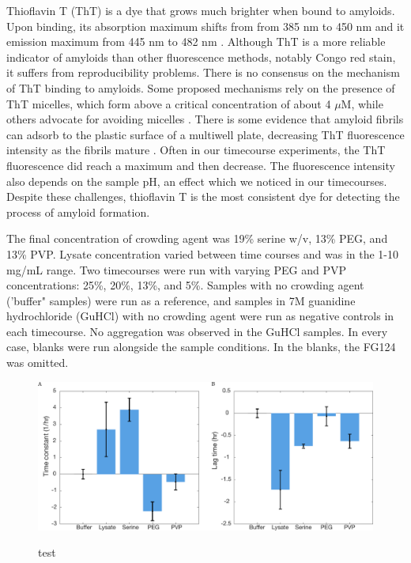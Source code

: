 Thioflavin T (ThT) is a dye that grows much brighter when bound to amyloids.  Upon binding, its absorption maximum shifts from from 385 nm to 450 nm and it emission maximum from 445 nm to 482 nm \cite{picken12}.  Although ThT is a more reliable indicator of amyloids than other fluorescence methods, notably Congo red stain, it suffers from reproducibility problems.  There is no consensus on the mechanism of ThT binding to amyloids.  Some proposed mechanisms rely on the presence of ThT micelles, which form above a critical concentration of about 4 $\mu$M, while others advocate for avoiding micelles \cite{khurana05, groenning09}.  There is some evidence that amyloid fibrils can adsorb to the plastic surface of a multiwell plate, decreasing ThT fluorescence intensity as the fibrils mature \cite{murray13}.  Often in our timecourse experiments, the ThT fluorescence did reach a maximum and then decrease.  The fluorescence intensity also depends on the sample pH, an effect which we noticed in our timecourses.  Despite these challenges, thioflavin T is the most consistent dye for detecting the process of amyloid formation.

The final concentration of crowding agent was 19\% serine w/v, 13\% PEG, and 13\% PVP.  Lysate concentration varied between time courses and was in the 1-10 mg/mL range.  Two timecourses were run with varying PEG and PVP concentrations: 25\%, 20\%, 13\%, and 5\%.  Samples with no crowding agent ('buffer" samples) were run as a reference, and samples in 7M guanidine hydrochloride (GuHCl) with no crowding agent were run as negative controls in each timecourse.  No aggregation was observed in the GuHCl samples.  In every case, blanks were run alongside the sample conditions.  In the blanks, the FG124 was omitted.

\begin{figure}
\caption{test}
\centering
\includegraphics[width=\textwidth]{figs/ch05/barCharts}
\label{fig:fitParams}
\end{figure}

